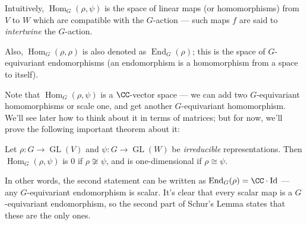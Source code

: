 Intuitively, $\operatorname{Hom}_G(\rho, \psi)$ is the space of linear maps (or homomorphisms) from $V$ to $W$ which are compatible with the $G$-action --- such maps $f$ are said to \emph{intertwine} the $G$-action.  

Also, $\operatorname{Hom}_G(\rho, \rho)$ is also denoted as $\operatorname{End}_G(\rho)$; this is the space of $G$-equivariant endomorphisms (an endomorphism is a homomorphism from a space to itself). 

Note that $\operatorname{Hom}_G(\rho, \psi)$ is a $\CC$-vector space --- we can add two $G$-equivariant homomorphisms or scale one, and get another $G$-equivariant homomorphism. We'll see later how to think about it in terms of matrices; but for now, we'll prove the following important theorem about it: 

\begin{theorem} 
Let $\rho : G \to \operatorname{GL}(V)$ and $\psi : G \to \operatorname{GL}(W)$ be \emph{irreducible} representations. Then $\operatorname{Hom}_G(\rho, \psi)$ is $0$ if $\rho \not\cong \psi$, and is one-dimensional if $\rho \cong \psi$. 
\end{theorem}

In other words, the second statement can be written as $\operatorname{End}_G(\rho) = \CC\cdot \operatorname{Id}$ --- any $G$-equivariant endomorphism is scalar. It's clear that every scalar map is a $G$-equivariant endomorphism, so the second part of Schur's Lemma states that these are the only ones.

